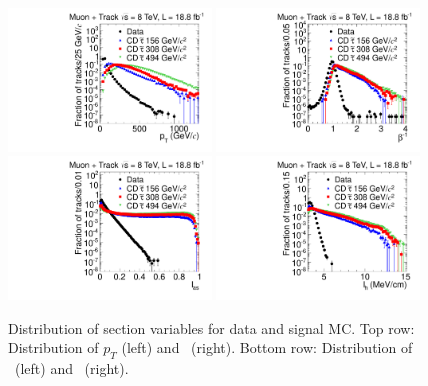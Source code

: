 \begin{figure}
\centering
  \includegraphics[clip=false, trim=0.0cm 0cm 0.0cm 0cm, width=0.48\textwidth]{figures/tkmu/Selection_Comp_8TeV_GMStau_Pt_BS}
  \includegraphics[clip=false, trim=0.0cm 0cm 0.0cm 0cm, width=0.48\textwidth]{figures/tkmu/Selection_Comp_8TeV_GMStau_TOF_BS} \\
  \includegraphics[clip=false, trim=0.0cm 0cm 0.0cm 0cm, width=0.48\textwidth]{figures/tkmu/Selection_Comp_8TeV_GMStau_Is_BS}
  \includegraphics[clip=false, trim=0.0cm 0cm 0.0cm 0cm, width=0.48\textwidth]{figures/tkmu/Selection_Comp_8TeV_GMStau_Im_BS}
  \caption[Distribution of selection variables in the \tktof\ analysis for data and signal MC.]
{Distribution of section variables for data and signal MC.
Top row: Distribution of $p_T$ (left) and \invbeta\ (right).
Bottom row: Distribution of \ias\ (left) and \ih\ (right).}
    \label{fig:TkMuSelVar}
\end{figure}

